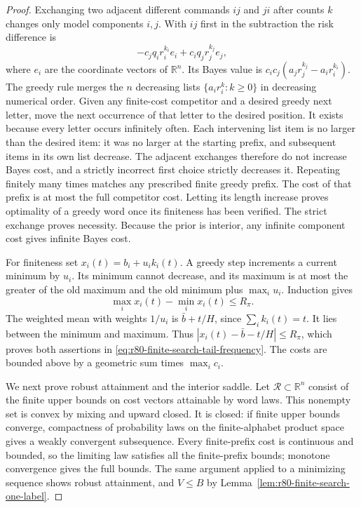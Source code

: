 \begin{proof}
Exchanging two adjacent different commands $ij$ and $ji$ after counts
$k$ changes only model components $i,j$.  With $ij$ first in the
subtraction the risk difference is
\begin{equation}\label{eq:r80-finite-search-exchange}
 -c_jq_i r_i^{k_i}e_i+c_iq_j r_j^{k_j}e_j,
\end{equation}
where $e_i$ are the coordinate vectors of $\mathbb R^n$.
Its Bayes value is
$c_ic_j(a_jr_j^{k_j}-a_ir_i^{k_i})$.
The greedy rule merges the $n$ decreasing lists
$\{a_i r_i^k:k\ge0\}$ in decreasing numerical order.
Given any finite-cost competitor and a desired greedy next letter,
move the next occurrence of that letter to the desired position.
It exists because every letter occurs infinitely often.  Each
intervening list item is no larger than the desired item: it was no
larger at the starting prefix, and subsequent items in its own list
decrease.  The adjacent exchanges therefore do not increase Bayes
cost, and a strictly incorrect first choice strictly decreases it.
Repeating finitely many times matches any prescribed finite greedy
prefix.  The cost of that prefix is at most the full competitor cost.
Letting its length increase proves optimality of a greedy word once
its finiteness has been verified.  The strict exchange proves
necessity.  Because the prior is interior, any infinite component
cost gives infinite Bayes cost.

For finiteness set $x_i(t)=b_i+u_i k_i(t)$.  A greedy step increments
a current minimum by $u_i$.  Its minimum cannot decrease, and its
maximum is at most the greater of the old maximum and the old minimum
plus $\max_i u_i$.  Induction gives
\[
 \max_i x_i(t)-\min_i x_i(t)\le R_\pi.
\]
The weighted mean with weights $1/u_i$ is
$\bar b+t/H$, since $\sum_i k_i(t)=t$.  It lies between the minimum
and maximum.  Thus $|x_i(t)-\bar b-t/H|\le R_\pi$, which proves
both assertions in \eqref{eq:r80-finite-search-tail-frequency}.
The costs are bounded above by a geometric sum times $\max_i c_i$.

We next prove robust attainment and the interior saddle.  Let
$\mathcal R\subset\mathbb R^n$ consist of the finite upper bounds
on cost vectors attainable by word laws.  This nonempty set is convex
by mixing and upward closed.  It is closed: if finite upper bounds
converge, compactness of probability laws on the finite-alphabet
product space gives a weakly convergent subsequence.  Every
finite-prefix cost is continuous and bounded, so the limiting law
satisfies all the finite-prefix bounds; monotone convergence gives
the full bounds.  The same argument applied to a minimizing sequence
shows robust attainment, and $V\le B$ by
Lemma~\ref{lem:r80-finite-search-one-label}.


\end{proof}
